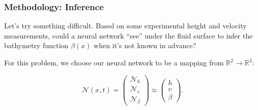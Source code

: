 \begin{frame}
    \frametitle{Methodology: Inference}

    Let's try something difficult. Based on some experimental height and velocity measurements, could a neural 
    network ``see'' under the fluid surface to infer the bathymetry function $\beta(x)$ when it's not known in advance?

    \bigskip
    \pause

    For this problem, we choose our neural network to be a mapping from 
    $\mathbb{R}^2 \to \mathbb{R}^3$:

    $$
    \mathcal{N}(x, t) = \begin{pmatrix*}
        \mathcal{N}_h \\
        \mathcal{N}_v \\
        \mathcal{N}_{\beta}
    \end{pmatrix*} \approx \begin{pmatrix*}
        h \\
        v \\
        \beta
    \end{pmatrix*}.
    $$
\end{frame}